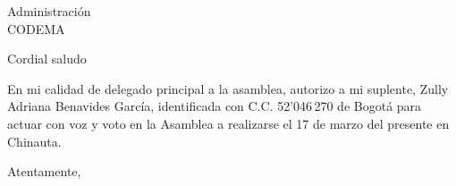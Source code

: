 \documentclass[letterpaper,spanish]{letter}
\begin{document}
\begin{letter}{Administraci\'{o}n\\CODEMA}
	
\opening{Cordial saludo}
En mi calidad de delegado principal a la asamblea, autorizo a mi suplente, Zully Adriana Benavides Garc\'{i}a, identificada con C.C. 52'046\,270 de Bogot\'{a} para actuar con voz y voto en la Asamblea a realizarse el 17 de marzo del presente en Chinauta.

\closing{Atentamente,}


\end{letter}
\end{document}
